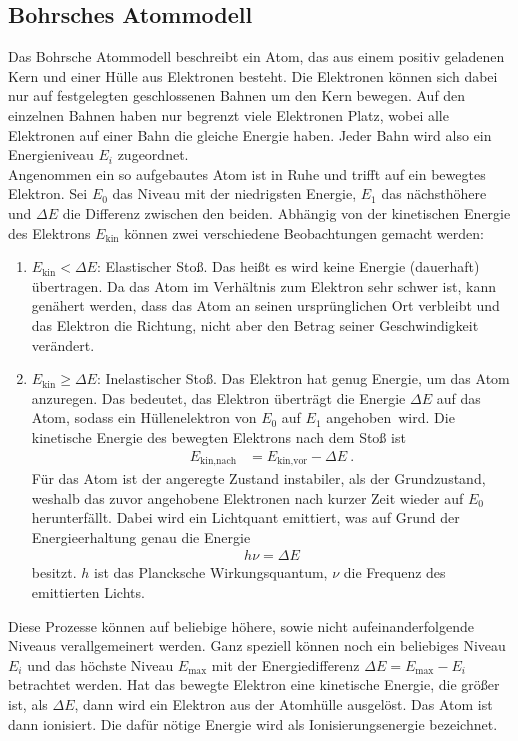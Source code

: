 \subsection{Bohrsches Atommodell}
Das Bohrsche Atommodell beschreibt ein Atom, das aus einem positiv geladenen Kern und einer Hülle aus Elektronen besteht. Die Elektronen können sich dabei nur auf festgelegten geschlossenen Bahnen um den Kern bewegen. Auf den einzelnen Bahnen haben nur begrenzt viele Elektronen Platz, wobei alle Elektronen auf einer Bahn die gleiche Energie haben. Jeder Bahn wird also ein Energieniveau $E_i$ zugeordnet. \cite[Kap. 14.1.1]{Walcher}\\
Angenommen ein so aufgebautes Atom ist in Ruhe und trifft auf ein bewegtes Elektron. Sei $E_0$ das Niveau mit der niedrigsten Energie, $E_1$ das nächsthöhere und $\Delta E$ die Differenz zwischen den beiden. Abhängig von der kinetischen Energie des Elektrons $E_\text{kin}$ können zwei verschiedene Beobachtungen gemacht werden:
\begin{enumerate}
	\item $E_\text{kin}<\Delta E$: Elastischer Stoß. Das heißt es wird keine Energie (dauerhaft) übertragen. Da das Atom im Verhältnis zum Elektron sehr schwer ist, kann genähert werden, dass das Atom an seinen ursprünglichen Ort verbleibt und das Elektron die Richtung, nicht aber den Betrag seiner Geschwindigkeit verändert.
	\item $E_\text{kin}\geq\Delta E$: Inelastischer Stoß. Das Elektron hat genug Energie, um das Atom anzuregen. Das bedeutet, das Elektron überträgt die Energie $\Delta E$ auf das Atom, sodass ein Hüllenelektron von $E_0$ auf $E_1$ \grqq angehoben\grqq\ wird. Die kinetische Energie des bewegten Elektrons nach dem Stoß ist
	\begin{align}
		E_\text{kin,nach} &= E_\text{kin,vor} - \Delta E \ .
	\end{align}
	Für das Atom ist der angeregte Zustand instabiler, als der Grundzustand, weshalb das zuvor angehobene Elektronen nach kurzer Zeit wieder auf $E_0$ \grqq herunterfällt\grqq. Dabei wird ein Lichtquant emittiert, was auf Grund der Energieerhaltung genau die Energie
	\begin{align}\label{eq:energie1}
		h\nu = \Delta E
	\end{align}
	besitzt. $h$ ist das Plancksche Wirkungsquantum, $\nu$ die Frequenz des emittierten Lichts.
\end{enumerate}
Diese Prozesse können auf beliebige höhere, sowie nicht aufeinanderfolgende Niveaus verallgemeinert werden. Ganz speziell können noch ein beliebiges Niveau $E_i$ und das höchste Niveau $E_\text{max}$ mit der Energiedifferenz $\Delta E = E_\text{max}-E_i$ betrachtet werden. Hat das bewegte Elektron eine kinetische Energie, die größer ist, als $\Delta E$, dann wird ein Elektron aus der Atomhülle ausgelöst. Das Atom ist dann ionisiert. Die dafür nötige Energie wird als Ionisierungsenergie bezeichnet.
\clearpage

